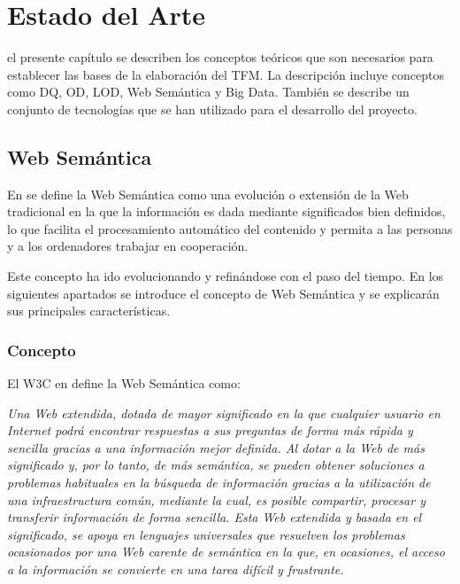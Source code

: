 \chapter{Estado del Arte}
\label{chap:estadoarte}

 el presente capítulo se describen los conceptos teóricos que
son necesarios para establecer las bases de la elaboración del \acs{TFM}. La
descripción incluye conceptos como \acf{DQ}, \acf{OD}, \acf{LOD}, Web
Semántica y Big Data. También se describe un conjunto de tecnologías que se han utilizado
para el desarrollo del proyecto. 




\section{Web Semántica}

En \cite{bernerslee2001semantic} se define la Web Semántica como una evolución o
extensión de la Web tradicional en la que la información es dada mediante
significados bien definidos, lo que facilita el procesamiento automático del
contenido y permita a las personas y a los ordenadores trabajar en cooperación. 

Este concepto ha ido evolucionando y refinándose con el paso del tiempo. En los
siguientes apartados se introduce el concepto de Web Semántica y se explicarán
sus principales características. 

\subsection{Concepto}

El \acf{W3C} en \cite{W3CSWES} define la Web Semántica como: 

\textit{Una Web extendida, dotada de mayor significado en la que cualquier
  usuario en Internet podrá encontrar respuestas a sus preguntas de forma más
  rápida y sencilla gracias a una información mejor definida. Al dotar a la Web
  de más significado y, por lo tanto, de más semántica, se pueden obtener
  soluciones a problemas habituales en la búsqueda de información gracias a la
  utilización de una infraestructura común, mediante la cual, es posible
  compartir, procesar y transferir información de forma sencilla. Esta Web
  extendida y basada en el significado, se apoya en lenguajes universales que
  resuelven los problemas ocasionados por una Web carente de semántica en la
  que, en ocasiones, el acceso a la información se convierte en una tarea
  difícil y frustrante.}

